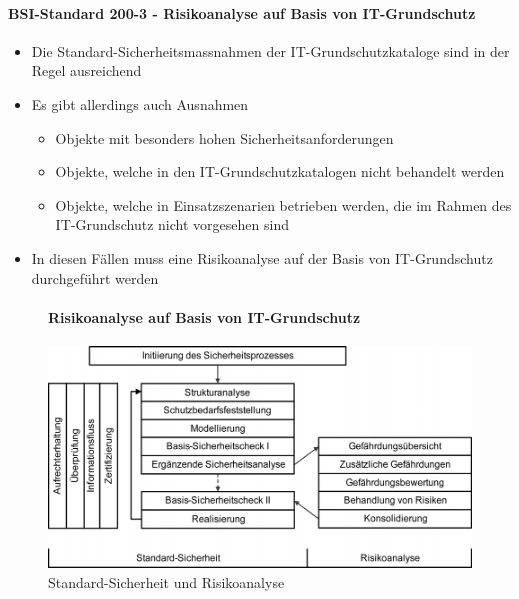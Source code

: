 \documentclass[10pt,a4paper]{article}
\begin{document}
\paragraph*{BSI-Standard 200-3 - Risikoanalyse auf Basis von IT-Grundschutz}\label{para:BSI 200-3}
\begin{itemize}[noitemsep,topsep=0pt,leftmargin=*]
    \item Die Standard-Sicherheitsmassnahmen der IT-Grundschutzkataloge sind in der Regel ausreichend
    \item Es gibt allerdings auch Ausnahmen
    \begin{itemize}[noitemsep,topsep=0pt,leftmargin=*]
        \item Objekte mit besonders hohen Sicherheitsanforderungen
        \item Objekte, welche in den IT-Grundschutzkatalogen nicht behandelt werden
        \item Objekte, welche in Einsatzszenarien betrieben werden, die im Rahmen des IT-Grundschutz nicht vorgesehen sind
    \end{itemize}
    \item In diesen Fällen muss eine Risikoanalyse auf der Basis von IT-Grundschutz durchgeführt werden
\end{itemize}

\begin{figure}[H]
\paragraph*{Risikoanalyse auf Basis von IT-Grundschutz}
    \begin{center}
    \includegraphics[width=16cm]{images/bsi100-3.png}
    \caption{Standard-Sicherheit und Risikoanalyse}
    \label{bsi100-3}
    \end{center}
\end{figure}
\end{document}
